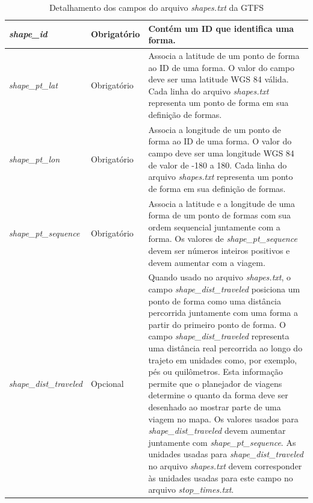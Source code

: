 \documentclass[
	12pt,				%
	oneside,			%
	a4paper,			%
	english,			%
	brazil				%
	]{abntex2ppgsi}
\begin{document}
{{\begin{apendicesenv}
\begin{table}
\caption{Detalhamento dos campos do arquivo \textit{shapes.txt} da GTFS}
      \label{tab:gtfsShapes}
\begin{tabular}[!htb]{>{\centering\arraybackslash}m{3.8cm} | >{\centering}m{2.5cm} | >{\centering\arraybackslash}m{8.5cm}}
\hline 
\textit{shape\_id} & Obrigatório & Contém um ID que identifica uma forma. \\
\hline 
\textit{shape\_pt\_lat} & Obrigatório & Associa a latitude de um ponto de forma ao ID de uma forma. O valor do campo deve ser uma latitude WGS 84 válida. Cada linha do arquivo \textit{shapes.txt} representa um ponto de forma em sua definição de formas.\\
\hline 
\textit{shape\_pt\_lon} & Obrigatório & Associa a longitude de um ponto de forma ao ID de uma forma. O valor do campo deve ser uma longitude WGS 84 de valor de -180 a 180. Cada linha do arquivo \textit{shapes.txt} representa um ponto de forma em sua definição de formas. \\
\hline 
\textit{shape\_pt\_sequence} & Obrigatório & Associa a latitude e a longitude de uma forma de um ponto de formas com sua ordem sequencial juntamente com a forma. Os valores de \textit{shape\_pt\_sequence} devem ser números inteiros positivos e devem aumentar com a viagem. \\
\hline 
\textit{shape\_dist\_traveled} & Opcional & Quando usado no arquivo \textit{shapes.txt}, o campo \textit{shape\_dist\_traveled} posiciona um ponto de forma como uma distância percorrida juntamente com uma forma a partir do primeiro ponto de forma. O campo \textit{shape\_dist\_traveled} representa uma distância real percorrida ao longo do trajeto em unidades como, por exemplo, pés ou quilômetros. Esta informação permite que o planejador de viagens determine o quanto da forma deve ser desenhado ao mostrar parte de uma viagem no mapa. Os valores usados para \textit{shape\_dist\_traveled} devem aumentar juntamente com \textit{shape\_pt\_sequence}. As unidades usadas para \textit{shape\_dist\_traveled} no arquivo \textit{shapes.txt} devem corresponder às unidades usadas para este campo no arquivo \textit{stop\_times.txt}. \\
\hline 
\end{tabular}
\end{table}
\vspace{-\baselineskip}

\clearpage


\end{apendicesenv}}}
\end{document}
